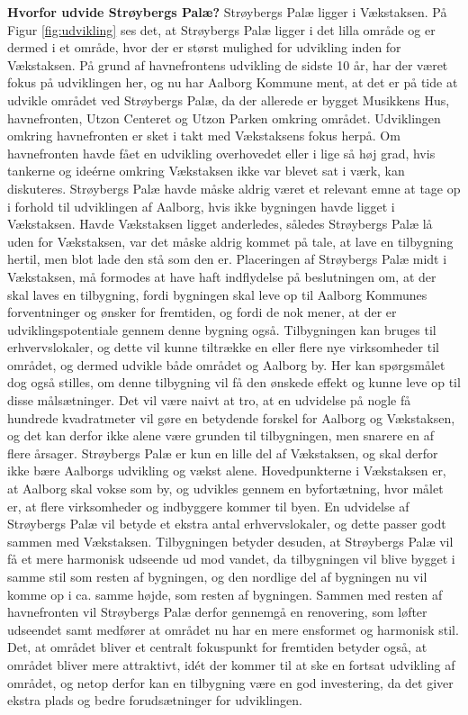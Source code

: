 \newline
\newline
\textbf{Hvorfor udvide Strøybergs Palæ?}
\newline
Strøybergs Palæ ligger i Vækstaksen. På Figur \ref{fig:udvikling} ses det, at Strøybergs Palæ ligger i det lilla område og er dermed i et område, hvor der er størst mulighed for udvikling inden for Vækstaksen. På grund af havnefrontens udvikling de sidste 10 år, har der været fokus på udviklingen her, og nu har Aalborg Kommune ment, at det er på tide at udvikle området ved Strøybergs Palæ, da der allerede er bygget Musikkens Hus, havnefronten, Utzon Centeret og Utzon Parken omkring området. Udviklingen omkring havnefronten er sket i takt med Vækstaksens fokus herpå. Om havnefronten havde fået en udvikling overhovedet eller i lige så høj grad, hvis tankerne og ideérne omkring Vækstaksen ikke var blevet sat i værk, kan diskuteres. Strøybergs Palæ havde måske aldrig været et relevant emne at tage op i forhold til udviklingen af Aalborg, hvis ikke bygningen havde ligget i Vækstaksen. Havde Vækstaksen ligget anderledes, således Strøybergs Palæ lå uden for Vækstaksen, var det måske aldrig kommet på tale, at lave en tilbygning hertil, men blot lade den stå som den er. Placeringen af Strøybergs Palæ midt i Vækstaksen, må formodes at have haft indflydelse på beslutningen om, at der skal laves en tilbygning, fordi bygningen skal leve op til Aalborg Kommunes forventninger og ønsker for fremtiden, og fordi de nok mener, at der er udviklingspotentiale gennem denne bygning også. Tilbygningen kan bruges til erhvervslokaler, og dette vil kunne tiltrække en eller flere nye virksomheder til området, og dermed udvikle både området og Aalborg by. Her kan spørgsmålet dog også stilles, om denne tilbygning vil få den ønskede effekt og kunne leve op til disse målsætninger. Det vil være naivt at tro, at en udvidelse på nogle få hundrede kvadratmeter vil gøre en betydende forskel for Aalborg og Vækstaksen, og det kan derfor ikke alene være grunden til tilbygningen, men snarere en af flere årsager. Strøybergs Palæ er kun en lille del af Vækstaksen, og skal derfor ikke bære Aalborgs udvikling og vækst alene.
\newline \indent{     }  Hovedpunkterne i Vækstaksen er, at Aalborg skal vokse som by, og udvikles gennem en byfortætning, hvor målet er, at flere virksomheder og indbyggere kommer til byen. En udvidelse af Strøybergs Palæ vil betyde et ekstra antal erhvervslokaler, og dette passer godt sammen med Vækstaksen. Tilbygningen betyder desuden, at Strøybergs Palæ vil få et mere harmonisk udseende ud mod vandet, da tilbygningen vil blive bygget i samme stil som resten af bygningen, og den nordlige del af bygningen nu vil komme op i ca. samme højde, som resten af bygningen. Sammen med resten af havnefronten vil Strøybergs Palæ derfor gennemgå en renovering, som løfter udseendet samt medfører at området nu har en mere ensformet og harmonisk stil. 
\newline \indent{     }  Det, at området bliver et centralt fokuspunkt for fremtiden betyder også, at området bliver mere attraktivt, idét der kommer til at ske en fortsat udvikling af området, og netop derfor kan en tilbygning være en god investering, da det giver ekstra plads og bedre forudsætninger for udviklingen.